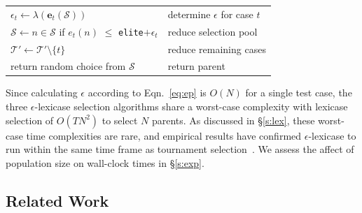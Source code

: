 \documentclass[twoside]{article}
\begin{document}
{\begin{tabularx}{\textwidth}{lX}
\hspace{1em}\hspace{1em}	$\epsilon_t \leftarrow \lambda(\mathbf{e}_t(\mathcal{S}))$	&	\hspace{1em}determine $\epsilon$ for case $t$\\
\hspace{1em}\hspace{1em}	$\mathcal{S} \leftarrow n \in \mathcal{S}$ if $e_t(n)$ $\leq$ \texttt{elite}$+\epsilon_{t}$	&	\hspace{1em}reduce selection pool\\
\hspace{1em}\hspace{1em}	$\mathcal{T'} \leftarrow \mathcal{T'} \setminus \{t\}$				&	\hspace{1em}reduce remaining cases\\
\hspace{1em} return random choice from $\mathcal{S}$															&	return parent  
\end{tabularx}
}
\medskip

Since calculating $\epsilon$ according to Eqn.~\ref{eq:ep} is $O(N)$ for a single test case, the three $\epsilon$-lexicase selection algorithms share a worst-case complexity with lexicase selection of $O(TN^2)$ to select $N$ parents. As discussed in \S\ref{s:lex}, these worst-case time complexities are rare, and empirical results have confirmed $\epsilon$-lexicase to run within the same time frame as tournament selection~\citep{la_cava_epsilon-lexicase_2016}. We assess the affect of population size on wall-clock times in \S\ref{s:exp}. %

\subsection{Related Work}\label{s:rw}
\end{document}
